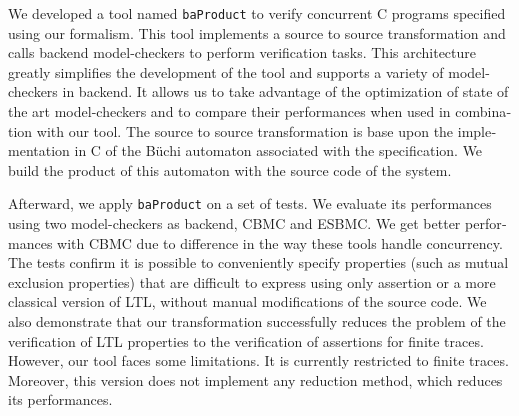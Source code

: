 \begin{otherlanguage}{english}
We developed a tool named \texttt{baProduct} to verify concurrent C programs
specified using our formalism. This tool implements a source to source
transformation and calls backend model-checkers to perform verification tasks.
This architecture greatly simplifies the development of the tool and supports a
variety of model-checkers in backend. It allows us to take advantage of the
optimization of state of the art model-checkers and to compare their
performances when used in combination with our tool.
The source to source transformation is base upon the implementation in C of the
Büchi automaton associated with the specification. We build the product of this
automaton with the source code of the system.

Afterward, we apply \texttt{baProduct} on a set of tests. We evaluate its
performances using two model-checkers as backend, CBMC and ESBMC. We get better
performances with CBMC due to difference in the way these tools handle
concurrency. The tests confirm it is possible to conveniently specify properties
(such as mutual exclusion properties) that are difficult to express using only
assertion or a more classical version of LTL, without manual modifications of
the source code. We also demonstrate that our transformation successfully reduces
the problem of the verification of LTL properties to the verification of
assertions for finite traces. However, our tool faces some limitations. It is
currently restricted to finite traces. Moreover, this version does not
implement any reduction method, which reduces its performances.

\end{otherlanguage}
